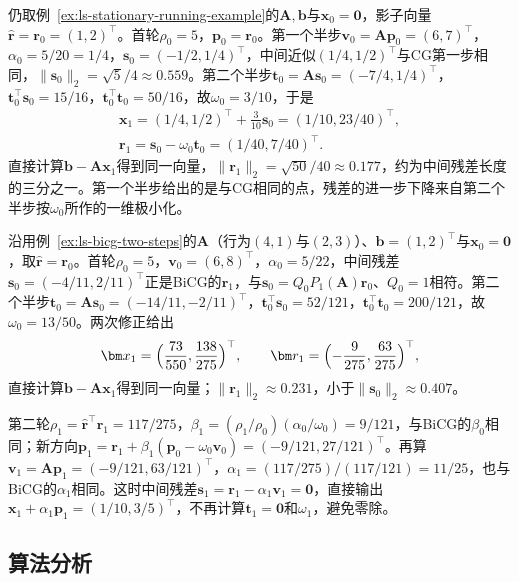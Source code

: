 \begin{example}[BiCGSTAB在贯穿例上的一轮]
\label{ex:ls-bicgstab-one-step}
仍取例~\ref{ex:ls-stationary-running-example}的$\bm A,\bm b$与$\bm x_0=\bm 0$，影子向量$\widehat{\bm r}=\bm r_0=(1,2)^\top$。首轮$\rho_0=5$，$\bm p_0=\bm r_0$。第一个半步$\bm v_0=\bm A\bm p_0=(6,7)^\top$，$\alpha_0=5/20=1/4$，$\bm s_0=(-1/2,1/4)^\top$，中间近似$(1/4,1/2)^\top$与CG第一步相同，$\lVert\bm s_0\rVert_2=\sqrt5/4\approx0.559$。第二个半步$\bm t_0=\bm A\bm s_0=(-7/4,1/4)^\top$，$\bm t_0^\top\bm s_0=15/16$，$\bm t_0^\top\bm t_0=50/16$，故$\omega_0=3/10$，于是
\[
 \begin{gathered}
 \bm x_1=(1/4,1/2)^\top+\tfrac3{10}\bm s_0=(1/10,23/40)^\top,\\
 \bm r_1=\bm s_0-\omega_0\bm t_0=(1/40,7/40)^\top .
 \end{gathered}
\]
直接计算$\bm b-\bm A\bm x_1$得到同一向量，$\lVert\bm r_1\rVert_2=\sqrt{50}/40\approx0.177$，约为中间残差长度的三分之一。第一个半步给出的是与CG相同的点，残差的进一步下降来自第二个半步按$\omega_0$所作的一维极小化。
\end{example}

\begin{example}[非对称二阶系统上的BiCGSTAB]
\label{ex:ls-bicgstab-nonsymmetric}
沿用例~\ref{ex:ls-bicg-two-steps}的$\bm A$（行为$(4,1)$与$(2,3)$）、$\bm b=(1,2)^\top$与$\bm x_0=\bm0$，取$\widehat{\bm r}=\bm r_0$。首轮$\rho_0=5$，$\bm v_0=(6,8)^\top$，$\alpha_0=5/22$，中间残差$\bm s_0=(-4/11,2/11)^\top$正是BiCG的$\bm r_1$，与$\bm s_0=Q_0P_1(\bm A)\bm r_0$、$Q_0=1$相符。第二个半步$\bm t_0=\bm A\bm s_0=(-14/11,-2/11)^\top$，$\bm t_0^\top\bm s_0=52/121$，$\bm t_0^\top\bm t_0=200/121$，故$\omega_0=13/50$。两次修正给出
\[
 \bm x_1=\Bigl(\frac{73}{550},\frac{138}{275}\Bigr)^\top,\qquad
 \bm r_1=\Bigl(-\frac9{275},\frac{63}{275}\Bigr)^\top ,
\]
直接计算$\bm b-\bm A\bm x_1$得到同一向量；$\lVert\bm r_1\rVert_2\approx0.231$，小于$\lVert\bm s_0\rVert_2\approx0.407$。

第二轮$\rho_1=\widehat{\bm r}^\top\bm r_1=117/275$，$\beta_1=(\rho_1/\rho_0)(\alpha_0/\omega_0)=9/121$，与BiCG的$\beta_0$相同；新方向$\bm p_1=\bm r_1+\beta_1(\bm p_0-\omega_0\bm v_0)=(-9/121,27/121)^\top$。再算$\bm v_1=\bm A\bm p_1=(-9/121,63/121)^\top$，$\alpha_1=(117/275)/(117/121)=11/25$，也与BiCG的$\alpha_1$相同。这时中间残差$\bm s_1=\bm r_1-\alpha_1\bm v_1=\bm0$，直接输出$\bm x_1+\alpha_1\bm p_1=(1/10,3/5)^\top$，不再计算$\bm t_1=\bm0$和$\omega_1$，避免零除。
\end{example}

\subsection{算法分析}

